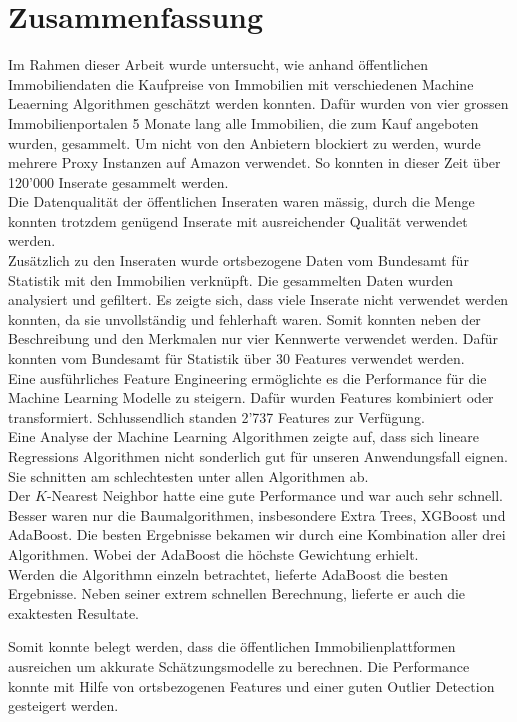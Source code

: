 \section{Zusammenfassung}
Im Rahmen dieser Arbeit wurde untersucht, wie anhand öffentlichen Immobiliendaten die Kaufpreise von Immobilien mit verschiedenen Machine Leaerning Algorithmen geschätzt werden konnten. Dafür wurden von vier grossen Immobilienportalen 5 Monate lang alle Immobilien, die zum Kauf angeboten wurden, gesammelt. Um nicht von den Anbietern blockiert zu werden, wurde mehrere Proxy Instanzen auf Amazon verwendet. So konnten in dieser Zeit über 120’000 Inserate gesammelt werden.\\
Die Datenqualität der öffentlichen Inseraten waren mässig, durch die Menge konnten trotzdem genügend Inserate mit ausreichender Qualität verwendet werden.\\ 
Zusätzlich zu den Inseraten wurde ortsbezogene Daten vom Bundesamt für Statistik mit den Immobilien verknüpft.
Die gesammelten Daten wurden analysiert und gefiltert. Es zeigte sich, dass viele Inserate nicht verwendet werden konnten, da sie unvollständig und fehlerhaft waren. Somit konnten neben der Beschreibung und den Merkmalen nur vier Kennwerte verwendet werden. Dafür konnten vom Bundesamt für Statistik über 30 Features verwendet werden.\\
Eine ausführliches Feature Engineering ermöglichte es die Performance für die Machine Learning Modelle zu steigern. Dafür wurden Features kombiniert oder transformiert. Schlussendlich standen 2'737 Features zur Verfügung.\\
Eine Analyse der Machine Learning Algorithmen zeigte auf, dass sich lineare Regressions Algorithmen nicht sonderlich gut für unseren Anwendungsfall eignen. Sie schnitten am schlechtesten unter allen Algorithmen ab.\\
Der $K$-Nearest Neighbor hatte eine gute Performance und war auch sehr schnell. Besser waren nur die Baumalgorithmen, insbesondere Extra Trees, XGBoost und AdaBoost. Die besten Ergebnisse bekamen wir durch eine Kombination aller drei Algorithmen. Wobei der AdaBoost die höchste Gewichtung erhielt.\\
Werden die Algorithmn einzeln betrachtet, lieferte AdaBoost die besten Ergebnisse. Neben seiner extrem schnellen Berechnung, lieferte er auch die exaktesten Resultate.

Somit konnte belegt werden, dass die öffentlichen Immobilienplattformen ausreichen um akkurate Schätzungsmodelle zu berechnen. Die Performance konnte mit Hilfe von ortsbezogenen Features und einer guten Outlier Detection gesteigert werden.
